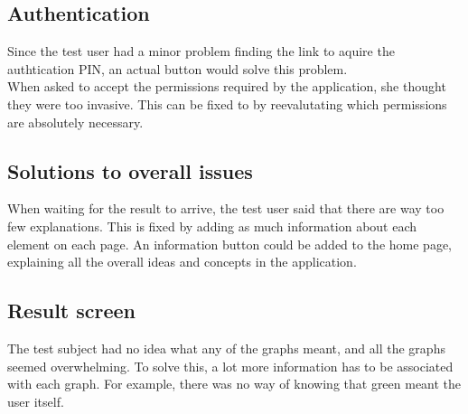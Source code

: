 \subsection{Authentication}
Since the test user had a minor problem finding the link to aquire the
authtication PIN, an actual button would solve this problem.\\
When asked to accept the permissions required by the application, she thought
they were too invasive. This can be fixed to by reevalutating which permissions
are absolutely necessary.

\subsection{Solutions to overall issues}
When waiting for the result to arrive, the test user said that there are way too
few explanations. This is fixed by adding as much information about each element
on each page. An information button could be added to the home page, explaining
all the overall ideas and concepts in the application.

\subsection{Result screen}
The test subject had no idea what any of the graphs meant, and all the graphs
seemed overwhelming. To solve this, a lot more information has to be
associated with each graph. For example, there was no way of knowing that green
meant the user itself. 





















